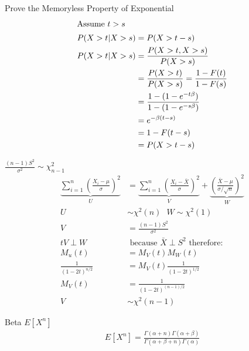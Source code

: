 \documentclass[avery5388,grid,frame]{flashcards}
\begin{document}
\begin{flashcard}[Proof]{Prove the Memoryless Property of Exponential}
{\begin{align*}
\intertext{Assume $t>s$}
P(X>t|X>s)&=P(X>t-s)\\
P(X>t|X>s)&=\frac{P(X>t,X>s)}{P(X>s)}\\
&=\frac{P(X>t)}{P(X>s)}=\frac{1-F(t)}{1-F(s)}\\
&=\frac{1-(1-e^{-t\beta})}{1-(1-e^{-s\beta})}\\
&=e^{-\beta(t-s)}\\
&=1-F(t-s)\\
&=P(X>t-s)
\end{align*}}
\end{flashcard}
\begin{flashcard}[Proof]{$\frac{(n-1)S^2}{\sigma^2}\sim\chi^2_{n-1}$}
\small{
{\begin{align*}
\underbrace{\sum_{i=1}^n\left(\frac{X_i-\mu}{\sigma}\right)^2}_{U}&=\underbrace{\sum_{i=1}^n\left(\frac{X_i-\bar{X}}{\sigma}\right)^2}_{V}+\underbrace{\left(\frac{\bar{X}-\mu}{\sigma/\sqrt{n}}\right)^2}_{W}\\
U&\sim \chi^2(n)\:\:\:W\sim \chi^2(1)\\
V&=\frac{(n-1)S^2}{\sigma^2}\\ t
V\perp W &\textrm{ because $\bar{X}\perp S^2$ therefore:}\\
M_u(t)&=M_V(t)M_W(t)\\
\frac{1}{(1-2t)^{n/2}}&=M_V(t)\frac{1}{(1-2t)^{1/2}}\\
M_V(t)&=\frac{1}{(1-2t)^{(n-1)/2}}\\
V&\sim \chi^2(n-1)
\end{align*}}}
\end{flashcard}
\begin{flashcard}{Beta $E[X^n]$}
\bigskip\bigskip
{\begin{align*}
E[X^n]=\frac{\Gamma(\alpha+n)\Gamma(\alpha+\beta)}{\Gamma(\alpha+\beta+n)\Gamma(\alpha)}
\end{align*}}
\end{flashcard}
\end{document}
